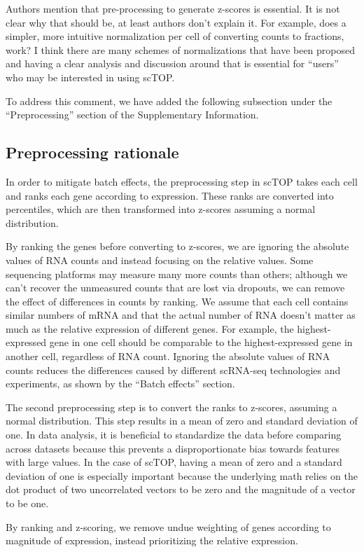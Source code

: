 \documentclass[12pt,american]{scrartcl}
\begin{document}
\begin{revcomment}
    Authors mention that pre-processing to generate z-scores is essential.
 It is not clear why that should be, at least authors don’t explain it. 
For example, does a simpler, more intuitive normalization per cell of 
converting counts to fractions, work? I think there are many schemes of 
normalizations that have been proposed and having a clear analysis and 
discussion around that is essential for “users” who may be interested in
 using scTOP.
\end{revcomment}
\begin{revresponse}
    To address this comment, we have added the following subsection under the ``Preprocessing'' section of the Supplementary Information.

    \begin{changes}
    \subsection*{Preprocessing rationale} 

    In order to mitigate batch effects, the preprocessing step in scTOP takes each cell and ranks each gene according to expression. These ranks are converted into percentiles, which are then transformed into z-scores assuming a normal distribution.
        
    By ranking the genes before converting to z-scores, we are ignoring the absolute values of RNA counts and instead focusing on the relative values. Some sequencing platforms may measure many more counts than others; although we can't recover the unmeasured counts that are lost via dropouts, we can remove the effect of differences in counts by ranking. We assume that each cell contains similar numbers of mRNA and that the actual number of RNA doesn't matter as much as the relative expression of different genes. For example, the highest-expressed gene in one cell should be comparable to the highest-expressed gene in another cell, regardless of RNA count. Ignoring the absolute values of RNA counts reduces the differences caused by different scRNA-seq technologies and experiments, as shown by the ``Batch effects'' section.
    
    The second preprocessing step is to convert the ranks to z-scores, assuming a normal distribution. This step results in a mean of zero and standard deviation of one. In data analysis, it is beneficial to standardize the data before comparing across datasets because this prevents a disproportionate bias towards features with large values. In the case of scTOP, having a mean of zero and a standard deviation of one is especially important because the underlying math relies on the dot product of two uncorrelated vectors to be zero and the magnitude of a vector to be one.
    
    By ranking and z-scoring, we remove undue weighting of genes according to magnitude of expression, instead prioritizing the relative expression.
    \end{changes}
    
\end{revresponse}
\end{document}
